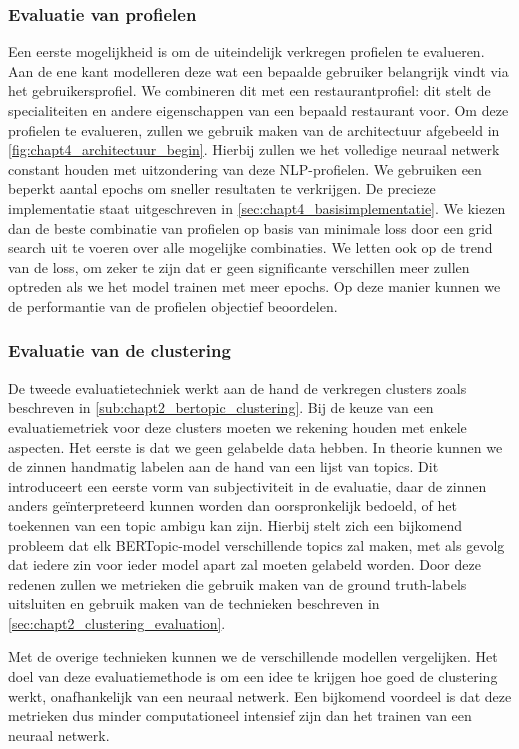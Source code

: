 \subsubsection{Evaluatie van profielen}
\label{sub:chapt4_evaluatie_profielen}
Een eerste mogelijkheid is om de uiteindelijk verkregen profielen te evalueren. Aan de ene kant modelleren deze wat een bepaalde gebruiker belangrijk vindt via het gebruikersprofiel. We combineren dit met een restaurantprofiel: dit stelt de specialiteiten en andere eigenschappen van een bepaald restaurant voor. Om deze profielen te evalueren, zullen we gebruik maken van de architectuur afgebeeld in \autoref{fig:chapt4_architectuur_begin}. Hierbij zullen we het volledige neuraal netwerk constant houden met uitzondering van deze NLP-profielen. We gebruiken een beperkt aantal epochs om sneller resultaten te verkrijgen. De precieze implementatie staat uitgeschreven in \autoref{sec:chapt4_basisimplementatie}. We kiezen dan de beste combinatie van profielen op basis van minimale loss door een grid search uit te voeren over alle mogelijke combinaties. We letten ook op de trend van de loss, om zeker te zijn dat er geen significante verschillen meer zullen optreden als we het model trainen met meer epochs. Op deze manier kunnen we de performantie van de profielen objectief beoordelen.

\subsubsection{Evaluatie van de clustering}

De tweede evaluatietechniek werkt aan de hand de verkregen clusters zoals beschreven in \autoref{sub:chapt2_bertopic_clustering}. Bij de keuze van een evaluatiemetriek voor deze clusters moeten we rekening houden met enkele aspecten. Het eerste is dat we geen gelabelde data hebben. In theorie kunnen we de zinnen handmatig labelen aan de hand van een lijst van topics. Dit introduceert een eerste vorm van subjectiviteit in de evaluatie, daar de zinnen anders geïnterpreteerd kunnen worden dan oorspronkelijk bedoeld, of het toekennen van een topic ambigu kan zijn. Hierbij stelt zich een bijkomend probleem dat elk BERTopic-model verschillende topics zal maken, met als gevolg dat iedere zin voor ieder model apart zal moeten gelabeld worden. Door deze redenen zullen we metrieken die gebruik maken van de ground truth-labels uitsluiten en gebruik maken van de technieken beschreven in \autoref{sec:chapt2_clustering_evaluation}.

Met de overige technieken kunnen we de verschillende modellen vergelijken. Het doel van deze evaluatiemethode is om een idee te krijgen hoe goed de clustering werkt, onafhankelijk van een neuraal netwerk. Een bijkomend voordeel is dat deze metrieken dus minder computationeel intensief zijn dan het trainen van een neuraal netwerk.

